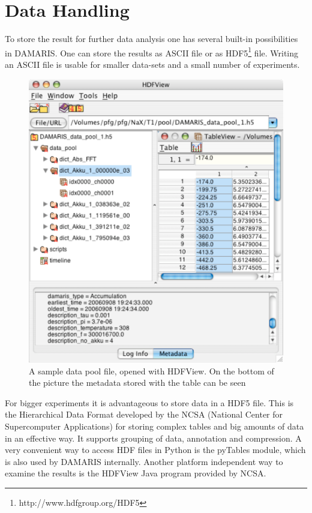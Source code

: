 \documentclass[12pt, a4paper, BCOR10mm, twoside, titlepage, headinclude]{scrbook}
\begin{document}
\section{Data Handling}
To store the result for further data analysis one has several built-in possibilities in \textsf{DAMARIS}. One can store the results as \textsf{ASCII} file or as \textsf{HDF5}\footnote{http://www.hdfgroup.org/HDF5} file. Writing  an \textsf{ASCII} file is usable for smaller data-sets and a small number of experiments. 

\begin{figure}
\centering
\includegraphics[scale=0.65]{result_file_t1} %
\caption{A sample data pool file, opened with \textsf{HDFView}. On the bottom of the picture the metadata stored with the table can be seen}
\end{figure}
For bigger experiments it is advantageous to store data in a \textsf{HDF5} file. This is the \textsf{H}ierarchical \textsf{D}ata \textsf{F}ormat developed by the \textsf{NCSA} (\textsf{N}ational \textsf{C}enter for \textsf{S}upercomputer \textsf{A}pplications) for storing complex tables and big amounts of data in an effective way. It supports grouping of data, annotation and compression. A very convenient way to access \textsf{HDF} files in Python is the \textsf{pyTables} module, which is also used by \textsf{DAMARIS} internally. Another platform independent way to examine the results is the \textsf{HDFView} Java program provided by \textsf{NCSA}.
\end{document}
